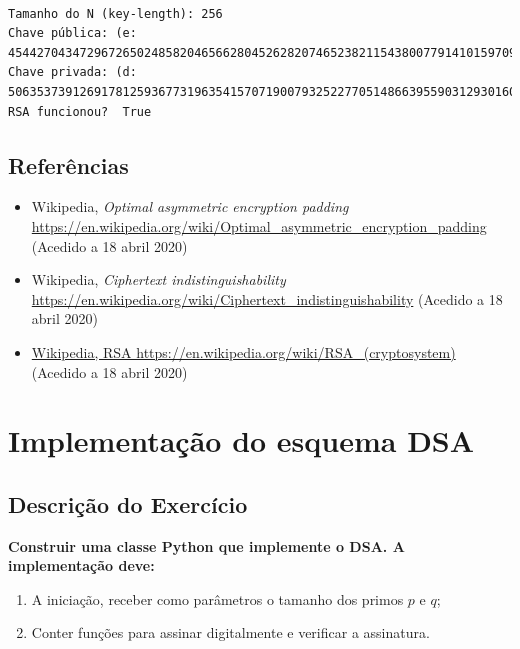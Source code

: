 \documentclass[12pt]{report}
\providecommand{\tightlist}{%
      \setlength{\itemsep}{0pt}\setlength{\parskip}{0pt}}
\begin{document}
    \begin{Verbatim}[commandchars=\\\{\}]

Tamanho do N (key-length): 256
Chave pública: (e: 45442704347296726502485820465662804526282074652382115438007791410159709848499)
Chave privada: (d: 50635373912691781259367731963541570719007932522770514866395590312930160020887)
RSA funcionou?  True

    \end{Verbatim}

    \subsection{Referências}\label{referuxeancias}

\begin{itemize}
\tightlist
\item
  Wikipedia, \emph{Optimal asymmetric encryption padding}
  \url{https://en.wikipedia.org/wiki/Optimal\_asymmetric\_encryption\_padding}
  (Acedido a 18 abril 2020)
\vspace{2 mm}
\item
  Wikipedia, \emph{Ciphertext indistinguishability}
 \url{https://en.wikipedia.org/wiki/Ciphertext\_indistinguishability}
  (Acedido a 18 abril 2020)
\vspace{2 mm}
\item
  \url{Wikipedia, RSA https://en.wikipedia.org/wiki/RSA\_(cryptosystem)}
  (Acedido a 18 abril 2020)
\end{itemize}   

\newpage

\section{Implementação do esquema
DSA}\label{implementauxe7uxe3o-do-esquema-dsa}
\vspace{10 mm}
\subsection{Descrição do
Exercício}\label{descriuxe7uxe3o-do-exercuxedcio}
\vspace{2 mm}
\textbf{Construir uma classe Python que implemente o DSA. A
implementação deve:}
\vspace{2 mm}
\begin{enumerate}
\def\labelenumi{\arabic{enumi}.}
\tightlist
\item
  A iniciação, receber como parâmetros o tamanho dos primos \(p\) e
  \(q\);
\vspace{2 mm}
\item
  Conter funções para assinar digitalmente e verificar a assinatura.
\end{enumerate}
\vspace{5 mm}
\end{document}
